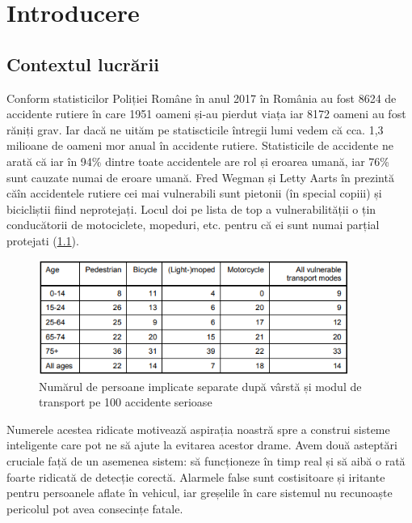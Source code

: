 
\chapter{Introducere}
\label{cap:Introducere}
 \section{Contextul lucrării}
Conform statisticilor Poliției Române \cite{politia_romana}  în anul 2017 în România au fost 8624 de accidente rutiere în care 1951 oameni și-au pierdut viața iar 8172 oameni au fost răniți grav. Iar dacă ne uităm pe statiscticile întregii lumi \cite{WHO}  vedem că cca. 1,3 milioane de oameni mor anual în accidente rutiere.\newline
Statisticile de accidente ne arată că iar în 94\% dintre toate accidentele are rol și eroarea umană, iar 76\% sunt cauzate numai de eroare umană.
 Fred Wegman și Letty Aarts  în \cite{SWOV} prezintă căîn accidentele rutiere cei mai vulnerabili sunt pietonii (în special copiii) și bicicliștii fiind neprotejați. Locul doi pe lista de top a vulnerabilității o țin conducătorii de motociclete, mopeduri, etc. pentru că ei sunt numai parțial protejati (\ref{fig:lethalities}).\newline
\begin{figure}[h!]
    	\centering
	\captionsetup{justification=centering,margin=2cm}
	\includegraphics[width=0.9\textwidth]{figures/lethality_rates.png}
	\caption{Numărul de persoane implicate separate după vârstă și modul de transport pe 100 accidente serioase \cite{SWOV}}
	\label{fig:lethalities}
\end{figure}
Numerele acestea ridicate motivează aspirația noastră spre a construi sisteme inteligente care pot ne să ajute la evitarea acestor drame. Avem două asteptări cruciale față de un asemenea sistem: să funcționeze în timp real și să aibă o rată foarte ridicată de detecție corectă. Alarmele false sunt costisitoare și iritante pentru persoanele aflate în vehicul, iar greșelile în care sistemul nu recunoaște pericolul pot avea consecințe fatale.\newline
